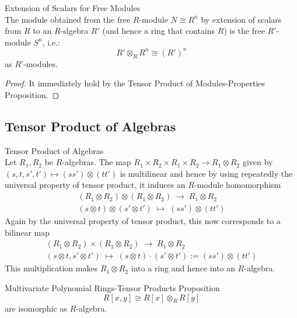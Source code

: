 \begin{proposition}{Extension of Scalars for Free Modules}\\
The module obtained from the free $R$-module $N \cong R^n$ by extension of scalars from $R$ to an $R$-slgebra $R'$ (and hence a ring that contains $R$) is the free $R'$-module $S^n$, i.e.:
$$R' \otimes_R R^n \cong (R')^n$$
as $R'$-modules.
\end{proposition}

\begin{proof}
    It immediately hold by the Tensor Product of Modules-Properties Proposition.
\end{proof}

\subsection{Tensor Product of Algebras}

\begin{definition}{Tensor Product of Algebras}\\
Let $R_1,R_2$ be $R$-algebras. The map $R_1 \times R_2 \times R_1 \times R_2 \to R_1 \otimes R_2$ given by $(s,t,s',t') \mapsto (ss') \otimes (tt')$ is multilinear and hence by using repeatedly the universal property of tensor product, it induces an $R$-module homomorphism
$$\substack{(R_1 \otimes R_2) \otimes (R_1 \otimes R_2) \;\to\; R_1 \otimes R_2 \\
(s \otimes t) \otimes (s' \otimes t') \;\mapsto\; (ss') \otimes (tt')} $$
Again by the universal property of tensor product, this now corresponds to a bilinear map
$$\substack{(R_1 \otimes R_2) \times (R_1 \otimes R_2) \;\to\; R_1 \otimes R_2 \\
(s \otimes t,s' \otimes t') \;\mapsto\; (s \otimes t) \cdot (s' \otimes t') := (ss') \otimes (tt')}$$
This multiplication makes $R_1 \otimes R_2$ into a ring and hence into an $R$-algebra.
\end{definition}


\begin{proposition}{Multivariate Polynomial Rings-Tensor Products Proposition}\\
$$R[x,y] \cong R[x] \otimes_R R[y]$$
are isomorphic as $R$-algebra.
\end{proposition}

